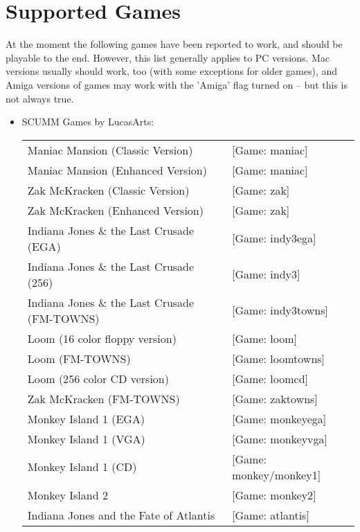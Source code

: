 


\section{Supported Games}

At the moment the following games have been reported to work, and should
be playable to the end. However, this list generally applies to PC versions.
Mac versions usually should work, too (with some exceptions for older games),
and Amiga versions of games may work with the 'Amiga' flag turned on -- but
this is not always true.

\begin{itemize}
\item SCUMM Games by LucasArts:\\
  \begin {tabular} [h] {ll}
    Maniac Mansion (Classic Version)&              [Game: maniac]\\
    Maniac Mansion (Enhanced Version)&             [Game: maniac]\\
    Zak McKracken (Classic Version)&               [Game: zak]\\
    Zak McKracken (Enhanced Version)&              [Game: zak]\\
    Indiana Jones \& the Last Crusade (EGA)&       [Game: indy3ega]\\
    Indiana Jones \& the Last Crusade (256)&       [Game: indy3]\\
    Indiana Jones \& the Last Crusade (FM-TOWNS)&  [Game: indy3towns]\\
    Loom (16 color floppy version)&                [Game: loom]\\
    Loom (FM-TOWNS)&                               [Game: loomtowns]\\
    Loom (256 color CD version)&                   [Game: loomcd]\\
    Zak McKracken (FM-TOWNS)&                      [Game: zaktowns]\\
    Monkey Island 1 (EGA)&                         [Game: monkeyega]\\
    Monkey Island 1 (VGA)&                         [Game: monkeyvga]\\
    Monkey Island 1 (CD)&                          [Game: monkey/monkey1]\\
    Monkey Island 2&                               [Game: monkey2]\\
    Indiana Jones and the Fate of Atlantis&        [Game: atlantis]\\

\end{tabular}
\end{itemize}
